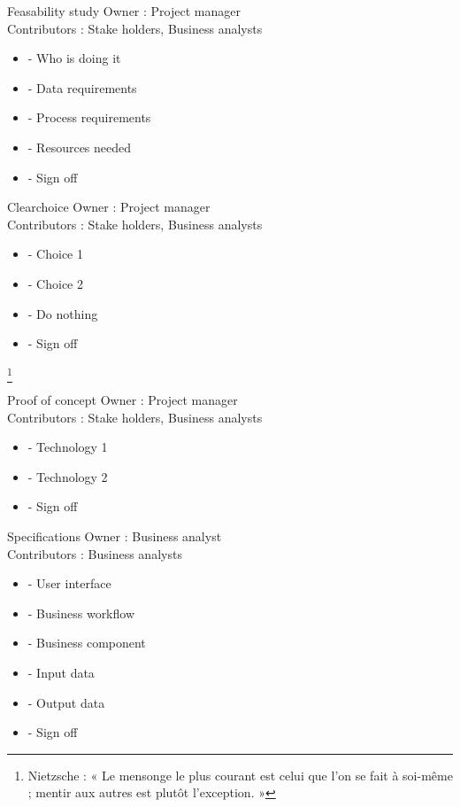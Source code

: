 \documentclass{beamer}
\begin{document}
\begin{frame}{Feasability study}
Owner : Project manager\\
Contributors : Stake holders, Business analysts\\
 \begin{itemize}
  \item
- Who is doing it 
  \item
- Data requirements 
  \item
- Process requirements 
  \item
- Resources needed 
  \item
- Sign off 
 \end{itemize}
\end{frame}

\begin{frame}{Clearchoice}
Owner : Project manager\\
Contributors : Stake holders, Business analysts\\
 \begin{itemize}
  \item
- Choice 1
  \item
- Choice 2
  \item
- Do nothing
  \item
- Sign off 
 \end{itemize}
\footnote{
\tiny{Nietzsche : « Le mensonge le plus courant est celui que l'on se fait à soi-même ; mentir aux autres est plutôt l'exception. »}
}
\end{frame}

\begin{frame}{Proof of concept}
Owner : Project manager\\
Contributors : Stake holders, Business analysts\\
 \begin{itemize}
  \item
- Technology 1
  \item
- Technology 2
  \item
- Sign off 
 \end{itemize}
\end{frame}

\begin{frame}{Specifications}
Owner : Business analyst\\
Contributors : Business analysts\\
 \begin{itemize}
  \item
- User interface
  \item
- Business workflow
  \item
- Business component
  \item
- Input data
  \item
- Output data
  \item
- Sign off 
 \end{itemize}
\end{frame}
\end{document}
